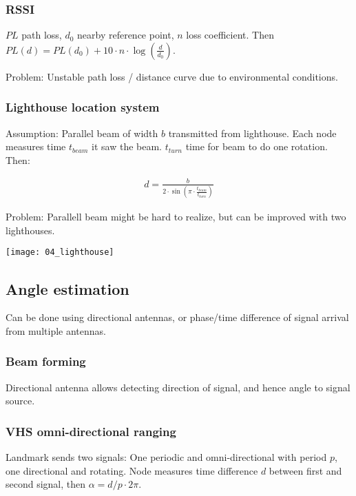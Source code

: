 \subsubsection{RSSI}

$PL$ path loss, $d_0$ nearby reference point, $n$ loss coefficient. Then $PL(d)
= PL(d_0) + 10 \cdot n \cdot \log(\frac{d}{d_0})$.

Problem: Unstable path loss / distance curve due to environmental conditions.

\subsubsection{Lighthouse location system}

Assumption: Parallel beam of width $b$ transmitted from lighthouse. Each node
measures time $t_{beam}$ it saw the beam. $t_{turn}$ time for beam to do one
rotation. Then:

\begin{align*}
		d = \frac{b}{2 \cdot \sin(\pi \cdot \frac{t_{beam}}{t_{turn}})}
\end{align*}

Problem: Parallell beam might be hard to realize, but can be improved with two
lighthouses.

\texttt{[image: 04\_lighthouse]}

\subsection{Angle estimation}

Can be done using directional antennas, or phase/time difference of signal
arrival from multiple antennas.

\subsubsection{Beam forming}

Directional antenna allows detecting direction of signal, and hence angle to
signal source.

\subsubsection{VHS omni-directional ranging}

Landmark sends two signals: One periodic and omni-directional with period $p$,
one directional and rotating. Node measures time difference $d$ between first
and second signal, then $\alpha = d / p \cdot 2 \pi$.

